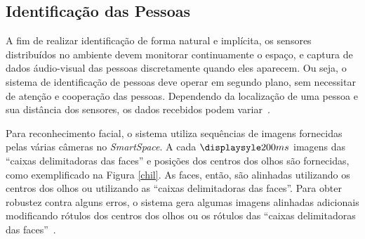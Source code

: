 

\subsection{Identificação das Pessoas}


A fim de realizar identificação de forma natural e implícita, os sensores distribuídos no ambiente devem monitorar continuamente o espaço, e captura de dados áudio-visual das pessoas discretamente quando eles aparecem. Ou seja, o sistema de identificação de pessoas
deve operar em segundo plano, sem necessitar de atenção e cooperação das pessoas. Dependendo da localização de uma pessoa e sua distância dos sensores, os dados recebidos podem variar~\cite{chil}. 

Para reconhecimento facial, o sistema utiliza sequências de imagens fornecidas pelas várias câmeras no \textit{SmartSpace}. A cada $\displaysyle 200ms$ imagens das ``caixas delimitadoras das faces'' e posições dos centros dos olhos são fornecidas, como exemplificado na Figura \ref{chil}. As faces, então, são alinhadas utilizando os centros dos olhos ou utilizando as ``caixas delimitadoras das faces''. Para obter robustez contra alguns erros, o sistema gera algumas imagens alinhadas adicionais modificando rótulos dos centros dos olhos ou os rótulos das ``caixas delimitadoras das faces''~\cite{chil}.

